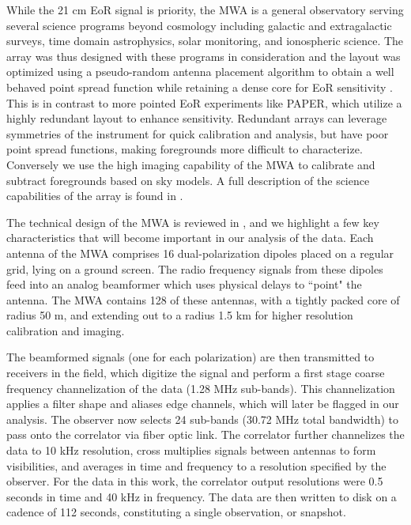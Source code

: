 \documentclass[iop]{emulateapj}
\begin{document}
While the 21 cm EoR signal is priority, the MWA is a general observatory serving several 
science programs beyond cosmology including galactic and extragalactic surveys, time 
domain astrophysics, solar monitoring, and ionospheric science. The array was thus 
designed with these programs in consideration and the layout was optimized using a 
pseudo-random antenna placement algorithm \citep{Beardsley:2012} to obtain a well 
behaved point spread function while retaining a dense core for EoR sensitivity 
\citep{Beardsley:2013}. This is in contrast to more pointed EoR experiments like PAPER, 
which utilize a highly redundant layout to enhance sensitivity. Redundant arrays can 
leverage symmetries of the instrument for quick calibration and analysis, but have poor 
point spread functions, making foregrounds more difficult to characterize. Conversely we 
use the high imaging capability of the MWA to calibrate and subtract foregrounds based on 
sky models. A full description of the science capabilities of the array is found in 
\citealt{Bowman:2013}. 

The technical design of the MWA is reviewed in \citealt{Tingay:2013}, and we highlight a 
few key characteristics that will become important in our analysis of the data. Each 
antenna of the MWA comprises 16 dual-polarization dipoles placed on a regular grid, lying 
on a ground screen. The radio frequency signals from these dipoles feed into an analog 
beamformer which uses physical delays to ``point" the antenna. The MWA contains 128 of 
these antennas, with a tightly packed core of radius 50 m, and extending out to a radius 
1.5 km for higher resolution calibration and imaging.

The beamformed signals (one for each polarization) are then transmitted to receivers in 
the field, which digitize the signal and perform a first stage coarse frequency 
channelization of the data (1.28 MHz sub-bands)\citep{Prabu:2015}. This channelization 
applies a filter shape and aliases edge channels, which will later be flagged in our analysis. 
The observer now selects 24 sub-bands (30.72 MHz total bandwidth) to pass onto the 
correlator via fiber optic link. The correlator further channelizes the data to 10 kHz 
resolution, cross multiplies signals between antennas to form visibilities, and averages in 
time and frequency to a resolution specified by the observer. For the data in this work, the 
correlator output resolutions were 0.5 seconds in time and 40 kHz in frequency. The data 
are then written to disk on a cadence of 112 seconds, constituting a single observation, or 
snapshot.
\end{document}
